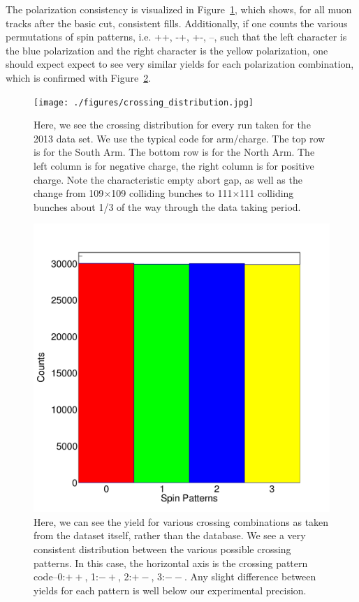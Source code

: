 The polarization consistency is visualized in Figure~\ref{fig:crossing_count},
which shows, for all muon tracks after the basic cut, consistent fills.
Additionally, if one counts the various permutations of spin patterns, i.e. ++,
-+, +-, --, such that the left character is the blue polarization and the right
character is the yellow polarization, one should expect expect to see very
similar yields for each polarization combination, which is confirmed with
Figure~\ref{fig:polarization_counts}.

\begin{figure}
  \centering
  \texttt{[image: ./figures/crossing\_distribution.jpg]}
  \caption{
    Here, we see the crossing distribution for every run taken for the 2013 data
    set. We use the typical code for arm/charge. The top row is for the South
    Arm. The bottom row is for the North Arm. The left column is for negative
    charge, the right column is for positive charge. Note the characteristic
    empty abort gap, as well as the change from 109$\times$109 colliding bunches
    to 111$\times$111 colliding bunches about 1/3 of the way through the data
    taking period.
  }
  \label{fig:crossing_count}
\end{figure}

\begin{figure}
  \centering
  \includegraphics[width=0.6\linewidth]{./figures/crossing_pattenr_count.jpg}
  \caption{
    Here, we can see the yield for various crossing combinations as taken from
    the dataset itself, rather than the database. We see a very consistent
    distribution between the various possible crossing patterns. In this case,
    the horizontal axis is the crossing pattern code--0:$++$, 1:$-+$, 2:$+-$,
    3:$--$. Any slight difference between yields for each pattern is well below
    our experimental precision.
  }
  \label{fig:polarization_counts}
\end{figure}

